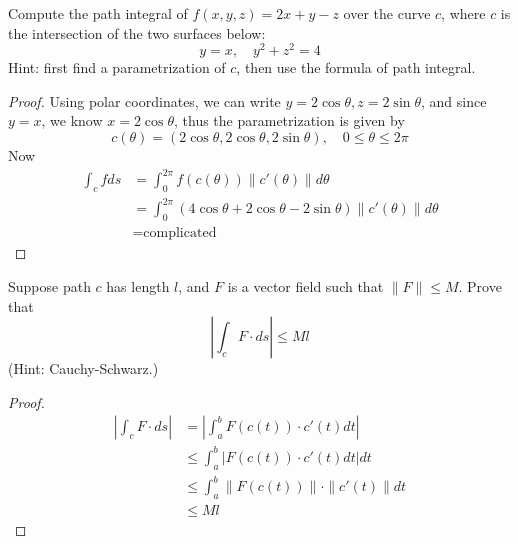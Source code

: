 \documentclass[openany]{book}
\begin{document}
\begin{prob}
    Compute the path integral of $f(x,y,z)=2x+y-z$ over the curve $c$, where $c$ is the intersection of the two surfaces below:
    \begin{equation*}
        y=x, \quad y^2+z^2=4
    \end{equation*}
    Hint: first find a parametrization of $c$, then use the formula of path integral.
\end{prob}
\begin{proof}
    Using polar coordinates, we can write $y=2\cos\theta, z=2\sin\theta$, and since $y=x$, we know $x=2\cos\theta$, thus the parametrization is given by 
    \begin{equation*}
        c(\theta)=(2\cos\theta, 2\cos\theta, 2\sin\theta), \quad 0\leq \theta\leq 2\pi
    \end{equation*}
    Now 
    \begin{align*}
        \int_cfds&=\int_0^{2\pi}f(c(\theta))\|c'(\theta)\|d\theta\\
        &=\int_0^{2\pi}\left(4\cos\theta+2\cos\theta-2\sin\theta\right)\|c'(\theta)\|d\theta\\
        &=\text{complicated}
    \end{align*}
\end{proof}

\begin{prob}
    Suppose path $c$ has length $l$, and $F$ is a vector field such that $\|F\|\leq M$. Prove that 
    \begin{equation*}
        \left|\int_c F\cdot ds\right|\leq Ml
    \end{equation*}
    (Hint: Cauchy-Schwarz.)
\end{prob}
\begin{proof}
    \begin{align*}
        \left|\int_cF\cdot ds\right|&=\left|\int_a^b F(c(t))\cdot c'(t)dt\right|\\
        &\leq\int_a^b\left|F(c(t))\cdot c'(t)dt\right|dt\\
        &\leq\int_a^b\|F(c(t))\|\cdot\|c'(t)\|dt\\
        &\leq Ml
    \end{align*}
\end{proof}
\end{document}
